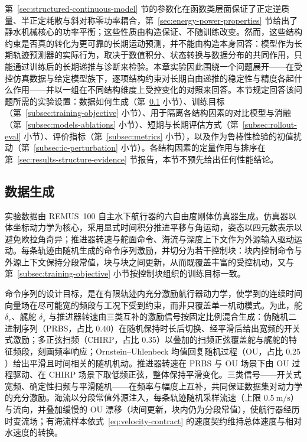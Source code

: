 第~\ref{sec:structured-continuous-model} 节的参数化在函数类层面保证了正定逆质量、半正定耗散与斜对称零功率耦合，第~\ref{sec:energy-power-properties} 节给出了静水机械核心的功率平衡；这些性质由构造保证、不随训练改变。然而，这些结构约束是否真的转化为更可靠的长期运动预测，并不能由构造本身回答：模型作为长期轨迹预测器的实际行为，取决于数值积分、状态转换与数据分布的共同作用，只能通过训练后的长期递推与诊断来检验。本章实验因此围绕一个问题展开——在受控仿真数据与给定模型族下，逐项结构约束对长期自由递推的稳定性与精度各起什么作用——并以一组在不同结构维度上受控变化的对照来回答。本节规定回答该问题所需的实验设置：数据如何生成（第~\ref{subsec:data-generation} 小节）、训练目标（第~\ref{subsec:training-objective} 小节）、用于隔离各结构因素的对比模型与消融（第~\ref{subsec:models-ablations} 小节）、短期与长期评估方式（第~\ref{subsec:rollout-eval} 小节）、评价指标（第~\ref{subsec:metrics} 小节），以及作为鲁棒性检验的初值扰动（第~\ref{subsec:ic-perturbation} 小节）。各结构因素的定量作用与排序在第~\ref{sec:results-structure-evidence} 节报告，本节不预先给出任何性能结论。

\subsection{数据生成}
\label{subsec:data-generation}

实验数据由 REMUS~100 自主水下航行器的六自由度刚体仿真器生成。仿真器以体坐标动力学为核心，采用显式时间积分推进平移与角运动，姿态以四元数表示以避免欧拉角奇异；推进器转速与舵面命令、海流与深度上下文作为外源输入驱动运动。每条轨迹由随机生成的命令序列激励，并切分为若干控制块：块内控制命令与外源上下文保持分段常值，块与块之间更新，从而既覆盖丰富的受控机动，又与第~\ref{subsec:training-objective} 小节按控制块组织的训练目标一致。

命令序列的设计目标，是在有限轨迹内充分激励航行器动力学，使学到的连续时间向量场在尽可能宽的频段与工况下受到约束，而非只覆盖单一机动模式。为此，舵 \(\delta_r\)、艉舵 \(\delta_s\) 与推进器转速由三类互补的激励信号按固定比例混合生成：伪随机二进制序列（PRBS，占比 \(0.40\)）在随机保持时长后切换、经平滑后给出宽频的开关式激励；多正弦扫频（CHIRP，占比 \(0.35\)）以叠加的扫频正弦覆盖舵与艉舵的特征频段，刻画频率响应；Ornstein--Uhlenbeck 均值回复随机过程（OU，占比 \(0.25\)）给出平滑且时间相关的随机机动。推进器转速在 PRBS 与 OU 场景下由 OU 过程驱动、在 CHIRP 场景下取低频正弦，整体保持平滑变化。三类信号——开关式宽频、确定性扫频与平滑随机——在频率与幅度上互补，共同保证数据集对动力学的充分激励。海流以分段常值外源注入，每条轨迹随机采样流速（上限 \(0.5~\mathrm{m/s}\)）与流向，并叠加缓慢的 OU 漂移（块间更新，块内仍为分段常值），使航行器经历时变流场；有海流样本依式~\eqref{eq:velocity-contract} 的速度契约维持总体速度与相对水速度的转换。

